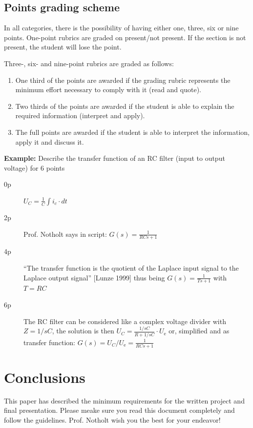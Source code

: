 	\subsection{Points grading scheme}
	
	In all categories, there is the possibility of having either one, three, six or nine points. One-point rubrics are graded on present/not present. If the section is not present, the student will lose the point.
	
	Three-, six- and nine-point rubrics are graded as follows:
	
	\begin{enumerate}
		\item One third of the points are awarded if the grading rubric represents the minimum effort necessary to comply with it (read and quote).
		\item Two thirds of the points are awarded if the student is able to explain the required information  (interpret and apply).
		\item The full points are awarded if the student is able to interpret the information, apply it and discuss it.
	\end{enumerate}

	{\bfseries Example:} Describe the transfer function of an RC filter (input to output voltage) for 6 points
	
	\begin{description}
		\item[0p] $U_{C} = \frac{1}{C}\int i_{c} \cdot dt$
		\item[2p] Prof. Notholt says in script: $G(s) = \frac{1}{RCs+1}$
		\item[4p] ``The transfer function is the quotient of the Laplace input signal to the Laplace output signal'' [Lunze 1999] thus being $G(s) = \frac{1}{Ts+1}$ with $T=RC$
		\item[6p] The RC filter can be considered like a complex voltage divider with $Z = 1/sC$, the solution is then $U_{C} = \frac{1/sC}{R + 1/sC} \cdot U_\textrm{e}$ or, simplified and as transfer function: $G(s) = U_{C}/U_\textrm{e} = \frac{1}{RCs + 1}$ 
	\end{description}
	
	
	\section{Conclusions}
	
	This paper has described the minimum requirements for the written project and final presentation. Please meake sure you read this document completely and follow the guidelines. Prof. Notholt wish you the best for your endeavor!

